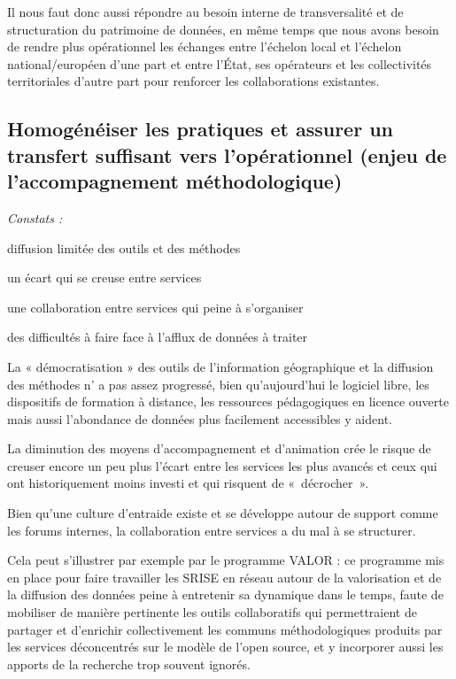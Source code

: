 Il nous faut donc aussi répondre au besoin interne de transversalité et de
structuration du patrimoine de données, en même temps que nous avons besoin de
rendre plus opérationnel les échanges entre l'échelon local et l'échelon
national/européen d'une part et entre l'État, ses opérateurs et les
collectivités territoriales d'autre part pour renforcer les collaborations
existantes.

\subsection[constats:homogeneisation]
{Homogénéiser les pratiques et assurer un transfert suffisant vers
l'opérationnel (enjeu de l'accompagnement méthodologique)}

{\it Constats :

\startitemize[a,packed]

\item diffusion limitée des outils et des méthodes

\item un écart qui se creuse entre services

\item une collaboration entre services qui peine à s'organiser

\item des difficultés à faire face à l'afflux de données à traiter

\stopitemize}

La « démocratisation » des outils de
l'information géographique et la diffusion des méthodes n' a pas assez progressé,
bien qu'aujourd'hui le logiciel libre, les dispositifs de formation à distance, les ressources
pédagogiques en licence ouverte mais aussi l'abondance de données plus
facilement accessibles y aident.

La diminution des moyens d'accompagnement et d'animation crée le risque de
creuser encore un peu plus l'écart entre les services les plus avancés et ceux
qui ont historiquement moins investi et qui risquent de « décrocher ».

Bien qu'une culture d'entraide existe et se développe autour de support comme
les forums internes, la collaboration entre services a du mal à se structurer.

Cela peut s'illustrer par exemple par le programme VALOR : ce programme mis en
place pour faire travailler les SRISE en réseau autour de la valorisation et
de la diffusion des données peine à entretenir sa dynamique dans le temps,
faute de mobiliser de manière pertinente les outils collaboratifs qui
permettraient de partager et d'enrichir collectivement les communs
méthodologiques produits par les services déconcentrés sur le modèle de l'open
source, et y incorporer aussi les apports de la recherche trop souvent
ignorés.

